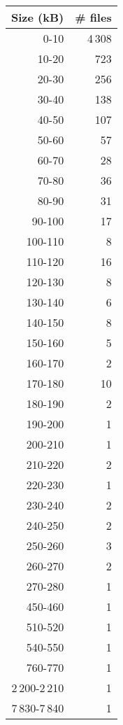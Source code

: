 \begin{tabular}{|r|r|}
\hline
\bf Size (kB)&\bf \# files\\
\hline
0-10&4\,308\\
\hline
10-20&723\\
\hline
20-30&256\\
\hline
30-40&138\\
\hline
40-50&107\\
\hline
50-60&57\\
\hline
60-70&28\\
\hline
70-80&36\\
\hline
80-90&31\\
\hline
90-100&17\\
\hline
100-110&8\\
\hline
110-120&16\\
\hline
120-130&8\\
\hline
130-140&6\\
\hline
140-150&8\\
\hline
150-160&5\\
\hline
160-170&2\\
\hline
170-180&10\\
\hline
180-190&2\\
\hline
190-200&1\\
\hline
200-210&1\\
\hline
210-220&2\\
\hline
220-230&1\\
\hline
230-240&2\\
\hline
240-250&2\\
\hline
250-260&3\\
\hline
260-270&2\\
\hline
270-280&1\\
\hline
450-460&1\\
\hline
510-520&1\\
\hline
540-550&1\\
\hline
760-770&1\\
\hline
2\,200-2\,210&1\\
\hline
7\,830-7\,840&1\\
\hline
\end{tabular}
